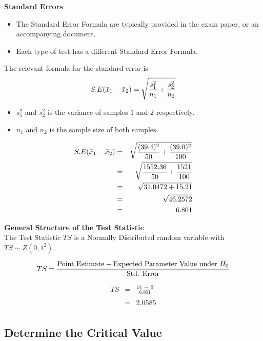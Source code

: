 \documentclass[a4paper,12pt]{article}
\begin{document}
\noindent \textbf{Standard Errors}
\begin{itemize}
    \item The Standard Error Formula are typically provided in the exam paper, or an accompanying document.
    \item Each type of test has a different Standard Error Formula.
\end{itemize}
\begin{framed}
 The relevant formula for the standard error is
\[ S.E(\bar{x}_1 - \bar{x}_2) = \sqrt{{s^2_1\over n_1}+{s^2_2 \over n_2}} \]
\end{framed}
\bigskip
\begin{itemize}
\item $s^2_1$ and $s^2_2$ is the variance of samples $1$ and $2$ respectively.
\item $n_1$ and $n_2$ is the sample size of both samples.\bigskip

\end{itemize}
\begin{eqnarray*}
 S.E(\bar{x}_1 - \bar{x}_2) &=& \sqrt{{(39.4)^2 \over 50}+{(39.0)^2 \over 100}}   \\
&=& \sqrt{{1552.36 \over 50}+{1521 \over 100}}   \\
&=& \sqrt{31.0472 + 15.21}  \\
&=& \sqrt{46.2572}  \\
&=& 6.801\\
\end{eqnarray*}
\newpage 

\noindent \textbf{General Structure of the Test Statistic}\\
\noindent The Test Statistic $TS$ is a Normally  Distributed random variable with $TS \sim Z(0,1^2)$.
\begin{framed}
\[ TS = {\mbox{Point Estimate} - \mbox{Expected Parameter Value under $H_{0}$} \over \mbox{Std. Error}}\]
\end{framed}


\begin{eqnarray*}
TS &=& \frac{ 14\;-\; 0}{6.801} \\
& & \\
&=& 2.0585\\
\end{eqnarray*}
\newpage 
\subsection*{Determine the Critical Value}
\end{document}
